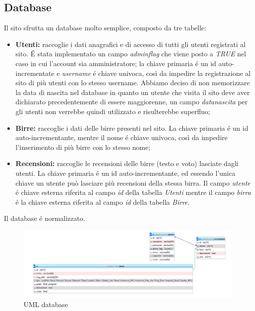 \subsection{Database}
Il sito sfrutta un database molto semplice, composto da tre tabelle:
\begin{itemize}
\item \textbf{Utenti:} raccoglie i dati anagrafici e di accesso di tutti gli utenti registrati al sito. \'E stata implementato un campo \textit{admin\textunderscore flag} che viene posto a \textit{TRUE} nel caso in cui l'account sia amministratore; la chiave primaria é un id auto-incrementate e \textit{username} é chiave univoca, così da impedire la registrazione al sito di più utenti con lo stesso username. Abbiamo deciso di non memorizzare la data di nascita nel database in quanto un utente che visita il sito deve aver dichiarato precedentemente di essere maggiorenne, un campo \textit{data\textunderscore nascita} per gli utenti non verrebbe quindi utilizzato e risulterebbe superfluo;
\item \textbf{Birre:} raccoglie i dati delle birre presenti nel sito. La chiave primaria é un id auto-incrementante, mentre il nome é chiave univoca, così da impedire l'inserimento di più birre con lo stesso nome;
\item \textbf{Recensioni:} raccoglie le recensioni delle birre (testo e voto) lasciate dagli utenti. La chiave primaria é un id auto-incrementante, ed essendo l'unica chiave un utente può lasciare più recensioni della stessa birra. Il campo \textit{utente} é chiave esterna riferita al campo \textit{id} della tabella \textit{Utenti} mentre il campo \textit{birra} é la chiave esterna riferita al campo \textit{id} della tabella \textit{Birre}.
\end{itemize}
Il database é normalizzato.
\begin{figure}[H]
	\centering
	\includegraphics[width=16cm]{utility/db.png}
	\caption{UML database}
\end{figure}


